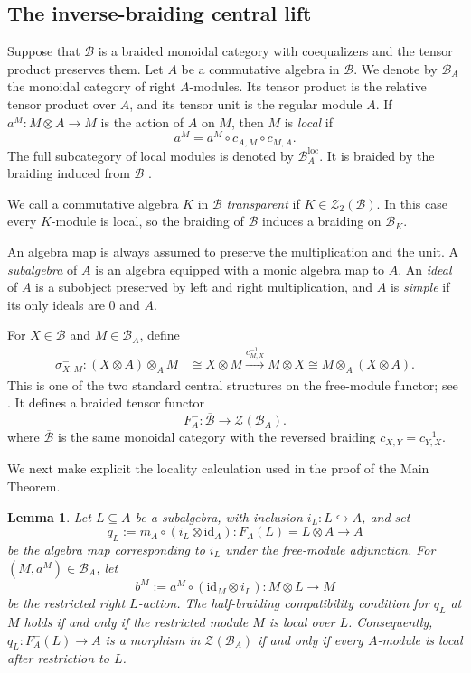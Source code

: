 \documentclass[10pt,a4paper]{amsart}
\numberwithin{equation}{section}
\newtheorem{lemma}[thmctr]{Lemma}
\newcommand{\B}{\mathcal{B}}
\newcommand{\Z}{\mathcal{Z}}
\newcommand{\loc}{\mathrm{loc}}
\newcommand{\id}{\mathrm{id}}
\newcommand{\oB}{\overline{\B}}
\begin{document}

\subsection{The inverse-braiding central lift}
Suppose that $\B$ is a braided monoidal category with coequalizers and the tensor product preserves them. Let $A$ be a commutative algebra in $\B$. We denote by $\B_A$ the monoidal category
of right $A$-modules. Its tensor product is the relative tensor product over
$A$, and its tensor unit is the regular module $A$. If $a^M:M\otimes A\to M$
is the action of $A$ on $M$, then $M$ is \emph{local} if
\[
  a^M=a^M\circ c_{A,M}\circ c_{M,A}.
\]
The full subcategory of local modules is denoted by $\B_A^{\loc}$. It is
braided by the braiding induced from $\B$
\cite[Section~2]{pareigis1995braiding}.

We call a commutative algebra $K$ in $\B$ \emph{transparent} if
$K\in\Z_2(\B)$. In this case every $K$-module is local, so the braiding of
$\B$ induces a braiding on $\B_K$.

An algebra map is always assumed to preserve the multiplication and the unit.
A \emph{subalgebra} of $A$ is an algebra equipped with a monic algebra map to
$A$. An \emph{ideal} of $A$ is a subobject preserved by left and right
multiplication, and $A$ is \emph{simple} if its only ideals are $0$ and $A$.

For $X\in\B$ and $M\in\B_A$, define
\[
\begin{aligned}
\sigma^-_{X,M}:(X\otimes A)\otimes_A M
&\cong X\otimes M
\xrightarrow{c_{M,X}^{-1}} M\otimes X
\cong M\otimes_A(X\otimes A).
\end{aligned}
\]
This is one of the two standard central structures on the free-module
functor; see
\cite[Exercises~8.8.3--8.8.5 and Proposition~8.8.10]{etingof2016tensor}.
It defines a braided tensor functor
\[
  F_A^-:\oB\longrightarrow\Z(\B_A).
\]
where $\oB$ is the same monoidal category with the reversed braiding $\overline{c}_{X,Y} = c_{Y,X}^{-1}$.

We next make explicit the locality calculation used in the proof of the Main
Theorem.

\begin{lemma}\label{lem:minus-half-braiding-locality}
Let $L\subseteq A$ be a subalgebra, with inclusion $i_L:L\hookrightarrow A$,
and set
\[
  q_L:=m_A\circ(i_L\otimes\id_A):F_A(L)=L\otimes A\longrightarrow A
\]
be the algebra map corresponding to $i_L$ under the free-module adjunction.
For $(M,a^M)\in\B_A$, let
\[
  b^M:=a^M\circ(\id_M\otimes i_L):M\otimes L\longrightarrow M
\]
be the restricted right $L$-action. The half-braiding compatibility condition
for $q_L$ at $M$ holds if and only if the restricted module $M$ is local over
$L$. Consequently, $q_L:F_A^-(L)\to A$ is a morphism in $\Z(\B_A)$ if and
only if every $A$-module is local after restriction to $L$.
\end{lemma}
\end{document}
